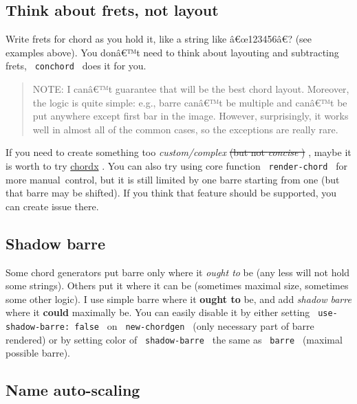 
\subsection{Think about frets, not
layout}\label{think-about-frets-not-layout}

Write frets for chord as you hold it, like a string like â€œ123456â€?
(see examples above). You donâ€™t need to think about layouting and
subtracting frets, \texttt{\ conchord\ } does it for you.

\begin{quote}
NOTE: I canâ€™t guarantee that will be the best chord layout. Moreover,
the logic is quite simple: e.g., barre canâ€™t be multiple and canâ€™t
be put anywhere except first bar in the image. However, surprisingly, it
works well in almost all of the common cases, so the exceptions are
really rare.
\end{quote}

If you need to create something too \emph{custom/complex} \st{(but not
\emph{concise} )} , maybe it is worth to try
\href{https://github.com/ljgago/typst-chords}{chordx} . You can also try
using core function \texttt{\ render-chord\ } for more manual~control,
but it is still limited by one barre starting from one (but that barre
may be shifted). If you think that feature should be supported, you can
create issue there.

\subsection{Shadow barre}\label{shadow-barre}

Some chord generators put barre only where it \emph{ought to} be (any
less will not hold some strings). Others put it where it can be
(sometimes maximal size, sometimes some other logic). I use simple barre
where it \textbf{ought to} be, and add \emph{shadow barre} where it
\textbf{could} maximally be. You can easily disable it by either setting
\texttt{\ use-shadow-barre:\ false\ } on \texttt{\ new-chordgen\ } (only
necessary part of barre rendered) or by setting color of
\texttt{\ shadow-barre\ } the same as \texttt{\ barre\ } (maximal
possible barre).

\subsection{Name auto-scaling}\label{name-auto-scaling}

